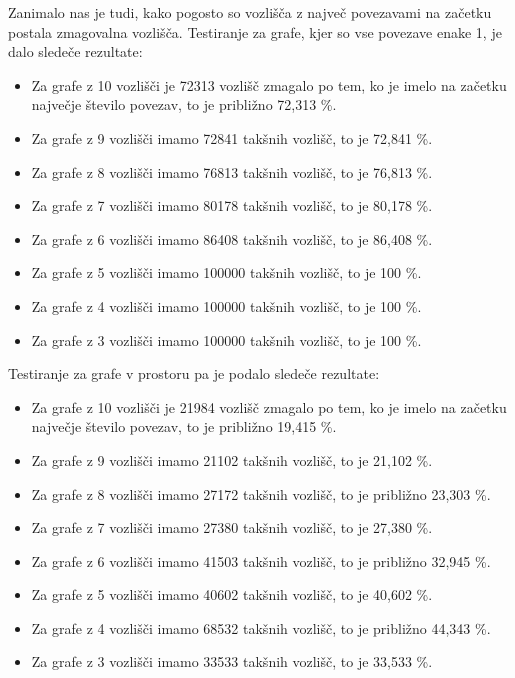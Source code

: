 \documentclass[fin1, tisk]{fmfdelo}
\begin{document}
Zanimalo nas je tudi, kako pogosto so vozlišča z največ povezavami na začetku postala zmagovalna vozlišča. Testiranje za grafe, kjer so vse povezave enake 1, je dalo sledeče rezultate:

\begin{itemize}
    \item Za grafe z 10 vozlišči je 72313 vozlišč zmagalo po tem, ko je imelo na začetku največje število povezav, to je približno 72,313 \%.
    \item Za grafe z 9 vozlišči imamo 72841 takšnih vozlišč, to je 72,841 \%.
    \item Za grafe z 8 vozlišči imamo 76813 takšnih vozlišč, to je 76,813 \%.
    \item Za grafe z 7 vozlišči imamo 80178 takšnih vozlišč, to je 80,178 \%.
    \item Za grafe z 6 vozlišči imamo 86408 takšnih vozlišč, to je 86,408 \%.
    \item Za grafe z 5 vozlišči imamo 100000 takšnih vozlišč, to je 100 \%.
    \item Za grafe z 4 vozlišči imamo 100000 takšnih vozlišč, to je 100 \%.
    \item Za grafe z 3 vozlišči imamo 100000 takšnih vozlišč, to je 100 \%.
\end{itemize}

Testiranje za grafe v prostoru pa je podalo sledeče rezultate:

\begin{itemize}
    \item Za grafe z 10 vozlišči je 21984 vozlišč zmagalo po tem, ko je imelo na začetku največje število povezav, to je približno 19,415 \%.
    \item Za grafe z 9 vozlišči imamo 21102 takšnih vozlišč, to je 21,102 \%.
    \item Za grafe z 8 vozlišči imamo 27172 takšnih vozlišč, to je približno 23,303 \%.
    \item Za grafe z 7 vozlišči imamo 27380 takšnih vozlišč, to je 27,380 \%.
    \item Za grafe z 6 vozlišči imamo 41503 takšnih vozlišč, to je približno 32,945 \%.
    \item Za grafe z 5 vozlišči imamo 40602 takšnih vozlišč, to je 40,602 \%.
    \item Za grafe z 4 vozlišči imamo 68532 takšnih vozlišč, to je približno 44,343 \%.
    \item Za grafe z 3 vozlišči imamo 33533 takšnih vozlišč, to je 33,533 \%.
\end{itemize}
\end{document}
